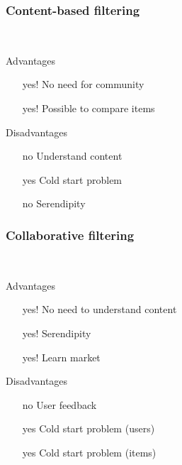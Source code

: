 \begin{frame}[t]
  \frametitle{Content-based filtering}
  \textit{}\\
  \textit{}

  Advantages\vspace{-2mm}
  \begin{itemize}
  \item [yes!] No need for community
  \item [yes!] Possible to compare items
  \end{itemize}

  \medskip
  Disadvantages\vspace{-2mm}
  \begin{itemize}
  \item [no] Understand content
  \item [yes] Cold start problem
  \item [no] Serendipity
  \end{itemize}
\end{frame}

\begin{frame}[t]
  \frametitle{Collaborative filtering}
  \textit{}\\
  \textit{}

  Advantages\vspace{-2mm}
  \begin{itemize}
  \item [yes!] No need to understand content
  \item [yes!] Serendipity
  \item [yes!] Learn market
  \end{itemize}

  \medskip
  Disadvantages\vspace{-2mm}
  \begin{itemize}
  \item [no] User feedback
  \item [yes] Cold start problem (users)
  \item [yes] Cold start problem (items)
  \end{itemize}
\end{frame}

